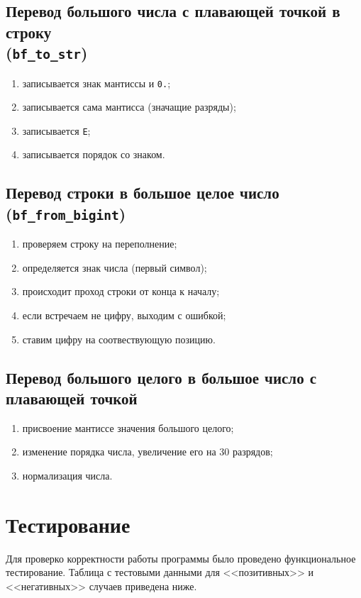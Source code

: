 \documentclass[a4paper,12pt]{extarticle}
\begin{document}
\subsection{Перевод большого числа с плавающей точкой в строку    \\ (\texttt{bf\_to\_str})}
\begin{enumerate}
    \item записывается знак мантиссы и \texttt{0.};
    \item записывается сама мантисса (значащие разряды);
    \item записывается \texttt{E};
    \item записывается порядок со знаком.
\end{enumerate}

\subsection{Перевод строки в большое целое число (\texttt{bf\_from\_bigint})}
\begin{enumerate}
    \item проверяем строку на переполнение;
    \item определяется знак числа (первый символ);
    \item происходит проход строки от конца к началу;
    \item если встречаем не цифру, выходим с ошибкой;
    \item ставим цифру на соотвествующую позицию.
\end{enumerate}

\subsection{Перевод большого целого в большое число с плавающей точкой}
\begin{enumerate}
    \item присвоение мантиссе значения большого целого;
    \item изменение порядка числа, увеличение его на 30 разрядов;
    \item нормализация числа.
\end{enumerate}

\newpage

\section{Тестирование}
Для проверко корректности работы программы было проведено функциональное тестирование. Таблица с тестовыми данными для <<позитивных>> и <<негативных>> случаев приведена ниже.
\end{document}
